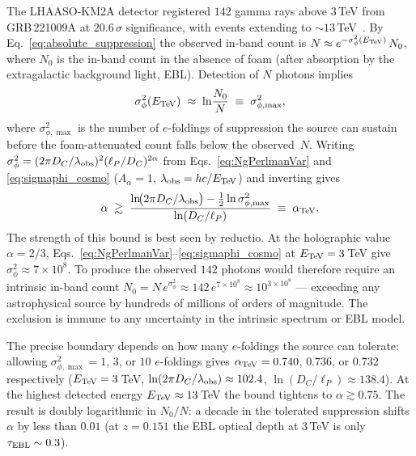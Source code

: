 \documentclass[aps,prd,onecolumn,amsmath,amssymb]{revtex4-2}
\begin{document}
The LHAASO-KM2A detector registered $142$ gamma rays above $3$\,TeV
from GRB\,221009A at $20.6\,\sigma$ significance, with events extending
to $\sim\!13$\,TeV~\cite{LHAASOWCDA2023,LHAASOTeV2023}.  By
Eq.~\eqref{eq:absolute_suppression} the observed in-band count is
$N\approx e^{-\sigma_\phi^2(E_{\rm TeV})}\,N_0$, where
$N_0$ is the in-band count in the absence of foam (after absorption by the
extragalactic background light, EBL).
Detection of $N$ photons implies
\begin{equation}
  \sigma_\phi^2(E_{\rm TeV})\;\approx\;\ln\!\frac{N_0}{N}
  \;\equiv\;\sigma_{\phi,\max}^2,
  \label{eq:tev_sigmaphi}
\end{equation}
where $\sigma_{\phi,\max}^2$ is the number of $e$-foldings of
suppression the source can sustain before the foam-attenuated count
falls below the observed~$N$.
Writing $\sigma_\phi^2=(2\pi D_C/\lambda_{\rm obs})^2(\ell_P/D_C)^{2\alpha}$
from Eqs.~\eqref{eq:NgPerlmanVar} and \eqref{eq:sigmaphi_cosmo}
($A_\alpha=1$, $\lambda_{\rm obs}=hc/E_{\rm TeV}$) and inverting gives
\begin{equation}
  \alpha \;\gtrsim\;
  \frac{\ln\!\bigl(2\pi D_C/\lambda_{\rm obs}\bigr)
        -\tfrac12\ln\sigma_{\phi,\max}^2}
       {\ln(D_C/\ell_P)}
  \;\equiv\; \alpha_{\rm TeV}.
  \label{eq:alpha_grb_tev}
\end{equation}
The strength of this bound is best seen by reductio.  At the holographic
value $\alpha=2/3$,
Eqs.~\eqref{eq:NgPerlmanVar}--\eqref{eq:sigmaphi_cosmo} at
$E_{\rm TeV}=3$\,TeV give
$\sigma_\phi^2\approx7\times10^{8}$.  To produce the observed $142$
photons would therefore require an intrinsic in-band count
$N_0 = N\,e^{\sigma_\phi^2}\approx 142\,e^{7\times10^8}
\approx 10^{3\times10^8}$ --- exceeding any astrophysical source by
hundreds of millions of orders of magnitude.  The exclusion is immune to
any uncertainty in the intrinsic spectrum or EBL model.

The precise boundary depends on how many $e$-foldings the source can
tolerate: allowing $\sigma_{\phi,\max}^2=1$, $3$, or $10$ $e$-foldings
gives $\alpha_{\rm TeV}=0.740$, $0.736$, or $0.732$ respectively
($E_{\rm TeV}=3$\,TeV, $\ln(2\pi D_C/\lambda_{\rm obs})\approx102.4$,
$\ln(D_C/\ell_P)\approx138.4$).  At the highest detected energy
$E_{\rm TeV}\approx13$\,TeV the bound tightens to $\alpha\gtrsim0.75$.
The result is doubly logarithmic in $N_0/N$: a decade in the tolerated
suppression shifts $\alpha$ by less than $0.01$
(at $z=0.151$ the EBL optical depth at $3$\,TeV is only
$\tau_{\rm EBL}\sim0.3$).
\end{document}
